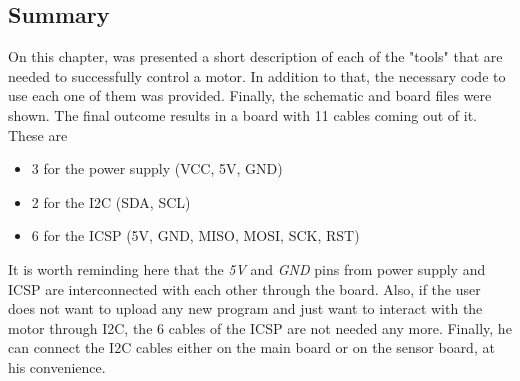 \subsection{Summary}

On this chapter, was presented a short description of each of the "tools" that are needed to successfully control a motor. In addition to that, the necessary code to use each one of them was provided. Finally, the schematic and board files were shown. The final outcome results in a board with 11 cables coming out of it. These are

\begin{itemize}
	\item 3 for the power supply (VCC, 5V, GND)
	\item 2 for the I2C (SDA, SCL)
	\item 6 for the ICSP (5V, GND, MISO, MOSI, SCK, RST)
\end{itemize}

It is worth reminding here that the \textit{5V} and \textit{GND} pins from power supply and ICSP are interconnected with each other through the board. Also, if the user does not want to upload any new program and just want to interact with the motor through I2C, the 6 cables of the ICSP are not needed any more. Finally, he can connect the I2C cables either on the main board or on the sensor board, at his convenience.
